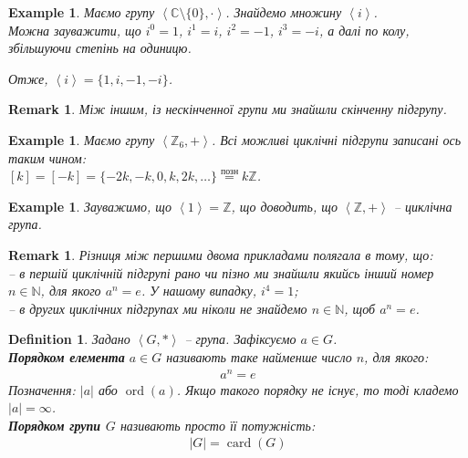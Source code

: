 \documentclass[a4paper, 10pt]{article}
\theoremstyle{theoremdd}
\theoremstyle{theoremdd}
\newtheorem{definition}[theorem]{Definition}
\theoremstyle{theoremdd}
\theoremstyle{theoremdd}
\theoremstyle{theoremdd}
\newtheorem{example}[theorem]{Example}
\theoremstyle{theoremdd}
\theoremstyle{theoremdd}
\theoremstyle{theoremdd}
\theoremstyle{theoremdd}
\theoremstyle{theoremdd}
\theoremstyle{theoremdd}
\newtheorem{remark}[theorem]{Remark}
\theoremstyle{theoremdd}
\theoremstyle{theoremdd}
\theoremstyle{theoremdd}
\theoremstyle{theoremdd}
\DeclareMathOperator{\ord}{ord}
\DeclareMathOperator{\card}{card}
\begin{document}
\begin{example}
Маємо групу $\left<\mathbb{C} \setminus \{0\}, \cdot \right>$. Знайдемо множину $\left<i\right>$.\\
Можна зауважити, що $i^0 = 1$, $i^1 = i$, $i^2 = -1$, $i^3 = -i$, а далі по колу, збільшуючи степінь на одиницю.
\begin{figure}[H]
\centering
{}
\end{figure}
Отже, $\left<i\right> = \{1,i,-1,-i\}$.
\end{example}

\begin{remark}
Між іншим, із нескінченної групи ми знайшли скінченну підгрупу.
\end{remark}

\begin{example}
Маємо групу $\left< \mathbb{Z}_6, + \right>$. Всі можливі циклічні підгрупи записані ось таким чином:\\
$[k] = [-k] = \{-2k,-k,0,k,2k,\dots\} \overset{\text{позн}}{=} k\mathbb{Z}$.
\end{example}

\begin{example}
Зауважимо, що $\left<1\right> = \mathbb{Z}$, що доводить, що $\left< \mathbb{Z}, + \right>$ -- циклічна група.
\end{example}

\begin{remark}
Різниця між першими двома прикладами полягала в тому, що: \\
-- в першій циклічній підгрупі рано чи пізно ми знайшли якийсь інший номер $n \in \mathbb{N}$, для якого $a^n = e$. У нашому випадку, $i^4 = 1$;\\
-- в других циклічних підгрупах ми ніколи не знайдемо $n \in \mathbb{N}$, щоб $a^n = e$.
\end{remark}

\begin{definition}
Задано $\left<G,* \right>$ -- група. Зафіксуємо $a \in G$.\\
\textbf{Порядком елемента} $a \in G$ називають таке найменше число $n$, для якого:
\begin{align*}
a^n = e
\end{align*}
Позначення: $|a|$ або $\ord (a)$. Якщо такого порядку не існує, то тоді кладемо $|a| = \infty$.\\
\textbf{Порядком групи $G$} називають просто її потужність:
\begin{align*}
|G| = \card(G)
\end{align*}
\end{definition}
\end{document}
